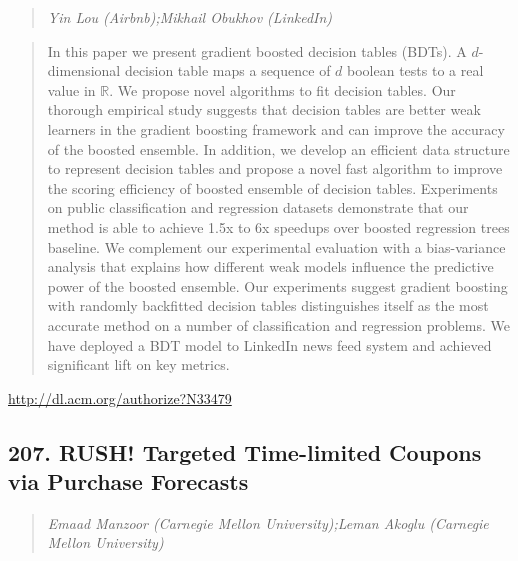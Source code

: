 \documentclass{article}
\begin{document}
\begin{quote}
\footnotesize{\textit{Yin Lou (Airbnb);Mikhail Obukhov (LinkedIn)}}

\end{quote}

\begin{quote}
In this paper we present gradient boosted decision tables (BDTs). A $d$-dimensional decision table maps a sequence of $d$ boolean tests to a real value in $\mathbb{R}$. We propose novel algorithms to fit decision tables. Our thorough empirical study suggests that decision tables are better weak learners in the gradient boosting framework and can improve the accuracy of the boosted ensemble. In addition, we develop an efficient data structure to represent decision tables and propose a novel fast algorithm to improve the scoring efficiency of boosted ensemble of decision tables. Experiments on public classification and regression datasets demonstrate that our method is able to achieve 1.5x to 6x speedups over boosted regression trees baseline. We complement our experimental evaluation with a bias-variance analysis that explains how different weak models influence the predictive power of the boosted ensemble. Our experiments suggest gradient boosting with randomly backfitted decision tables distinguishes itself as the most accurate method on a number of classification and regression problems. We have deployed a BDT model to LinkedIn news feed system and achieved significant lift on key metrics.
\end{quote}

\href{http://dl.acm.org/authorize?N33479}{http://dl.acm.org/authorize?N33479}

\subsection{207. RUSH! Targeted Time-limited Coupons via Purchase Forecasts}

\begin{quote}
\footnotesize{\textit{Emaad Manzoor (Carnegie Mellon University);Leman Akoglu (Carnegie Mellon University)}}

\end{quote}
\end{document}
